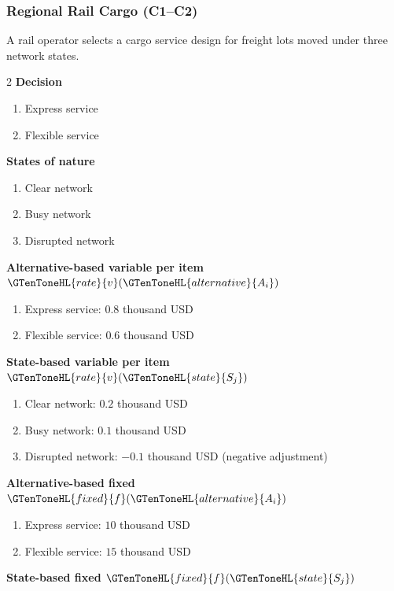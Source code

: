 	\subsubsection{Regional Rail Cargo (C1--C2)}
	\label{sec:problem35-regional-rail-cargo-c1-c2}
	A rail operator selects a cargo service design for freight lots moved under three network states.
	\begin{multicols}{2}
	\textbf{Decision }
	\begin{enumerate}[label=\arabic*.]
\item Express service
\item Flexible service
	\end{enumerate}
	\textbf{States of nature}
	\begin{enumerate}[label=\arabic*.]
\item Clear network
\item Busy network
\item Disrupted network
	\end{enumerate}
	\columnbreak
	\textbf{Alternative-based variable  per item $\GTenToneHL{rate}{v}(\GTenToneHL{alternative}{A_i})$}
\begin{enumerate}[label=\arabic*.]
\item Express service: $0.8$ thousand USD
\item Flexible service: $0.6$ thousand USD\end{enumerate}
\textbf{State-based variable  per item $\GTenToneHL{rate}{v}(\GTenToneHL{state}{S_j})$}
\begin{enumerate}[label=\arabic*.]
\item Clear network: $0.2$ thousand USD
\item Busy network: $0.1$ thousand USD
\item Disrupted network: $-0.1$ thousand USD (negative adjustment)\end{enumerate}
\textbf{Alternative-based fixed  $\GTenToneHL{fixed}{f}(\GTenToneHL{alternative}{A_i})$}
\begin{enumerate}[label=\arabic*.]
\item Express service: $10$ thousand USD
\item Flexible service: $15$ thousand USD\end{enumerate}
\textbf{State-based fixed  $\GTenToneHL{fixed}{f}(\GTenToneHL{state}{S_j})$}
\begin{enumerate}[label=\arabic*.]

\end{enumerate}
\end{multicols}

